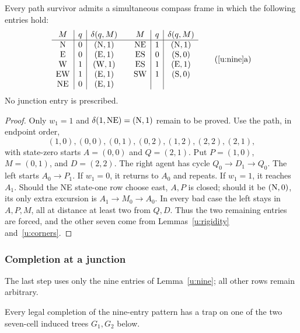 

\begin{lemma}\label{u:nine}
Every path survivor admits a simultaneous compass frame in which
the following entries hold:
\[
\begin{array}{c|c|c@{\qquad}c|c|c}
M&q&\delta(q,M)&M&q&\delta(q,M)\\ \hline
\N&0&(\N,1)&\mathrm{NE}&1&(\N,1)\\
\E&0&(\E,1)&\mathrm{ES}&0&(\Sdir,0)\\
\W&1&(\W,1)&\mathrm{ES}&1&(\E,1)\\
\mathrm{EW}&1&(\E,1)&\mathrm{SW}&1&(\Sdir,0)\\
\mathrm{NE}&0&(\E,1)&&&
\end{array}\tag{\ref{u:nine}a}
\]
No junction entry is prescribed.
\end{lemma}

\begin{proof}
Only $w_1=1$ and $\delta(1,\mathrm{NE})=(\mathrm{N},1)$ remain to be
proved. Use the path, in endpoint order,
\[
 (1,0),(0,0),(0,1),(0,2),(1,2),(2,2),(2,1),
\]
with state-zero starts $A=(0,0)$ and $Q=(2,1)$.
Put $P=(1,0)$, $M=(0,1)$, and $D=(2,2)$.
The right agent has cycle $Q_0\to D_1\to Q_0$.
The left starts $A_0\to P_1$. If $w_1=0$, it returns to $A_0$
and repeats. If $w_1=1$, it reaches $A_1$. Should the NE state-one
row choose east, $A,P$ is closed; should it be $(\mathrm{N},0)$, its only
extra excursion is $A_1\to M_0\to A_0$. In every bad case the
left stays in $A,P,M$, all at distance at least two from $Q,D$.
Thus the two remaining entries are forced, and the other seven
come from Lemmas~\ref{u:rigidity} and~\ref{u:corners}.
\end{proof}



\subsubsection{Completion at a junction}

The last step uses only the nine entries of Lemma~\ref{u:nine}; all
other rows remain arbitrary.

\begin{lemma}\label{u:junction}
Every legal completion of the nine-entry pattern has a trap on one
of the two seven-cell induced trees $G_1,G_2$ below.
\end{lemma}

